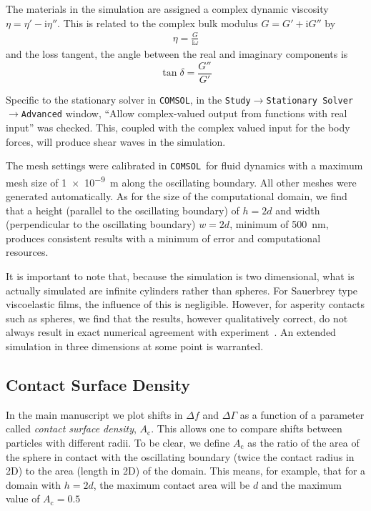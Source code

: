 \documentclass[floatfix,superscriptaddress,a4paper,notitlepage]{revtex4-1}
\newcommand{\mi}{{\mathrm{i}}}
\newcommand{\comsol}{\texttt{COMSOL}}
\newcommand{\df}{\Delta\!f}
\newcommand{\dg}{\Delta\Gamma}
\newcommand{\Ac}{A_\mathrm{c}}
\begin{document}
The materials in the simulation are assigned a complex dynamic viscosity
$\eta = \eta'-\mi\eta''$.  This is related to the complex bulk modulus
$G=G'+\mi G''$ by
\begin{align}
 \eta = \frac{G}{\mi \omega}
\end{align}
and the loss tangent, the angle between the real and imaginary components
is 
\begin{equation}
 \tan \delta = \frac{G''}{G'}
\end{equation}

Specific to the stationary solver in \comsol, in the
\texttt{Study$\rightarrow$Stationary Solver$\rightarrow$Advanced} window,
``Allow complex-valued output from functions with real input'' was checked.
This, coupled with the complex valued input for the body forces, will
produce shear waves in the simulation.

The mesh settings were calibrated in \comsol~for fluid dynamics with a
maximum mesh size of \SI{1e-9}{\meter} along the oscillating boundary.  All
other meshes were generated automatically.  As for the size of the
computational domain, we find that a height (parallel to the oscillating
boundary) of $h=2d$ and width (perpendicular to the oscillating boundary)  
$w=2d$, minimum of \SI{500}{\nano\meter}, produces consistent results with a
minimum of error and computational resources.

It is important to note that, because the simulation is two dimensional,
what is actually simulated are infinite cylinders rather than spheres.  For
Sauerbrey type viscoelastic films, the influence of this is negligible.
However, for asperity contacts such as spheres, we find that the results,
however qualitatively correct, do not always result in exact numerical
agreement with experiment~\cite{Vittorias2010489}.  An extended simulation
in three dimensions at some point is warranted.

\subsection{Contact Surface Density}

In the main manuscript we plot shifts in $\df$ and $\dg$ as a function of a
parameter called \textit{contact surface density}, $\Ac$.  This allows one
to compare shifts between particles with different radii.  To be clear, we
define $\Ac$ as the ratio of the area of the sphere in contact with the
oscillating boundary (twice the contact radius in 2D) to the area (length
in 2D) of the domain.  This means, for example, that for a domain with
$h=2d$, the maximum contact area will be $d$ and the maximum value of
$\Ac=0.5$
\end{document}
